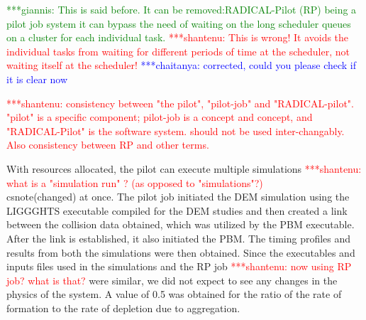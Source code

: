 \documentclass[preprint,11pt,authoryear]{elsarticle}
\newcommand{\jhanote}[1]{ {\textcolor{red} { ***shantenu: #1 }}}
\newcommand{\csnote}[1]{ {\textcolor{blue} { ***chaitanya: #1 }}}
\newcommand{\gpnote}[1]{{\textcolor{green} {***giannis: #1}}}
\newcommand{\jhanote}[1]{ {\textcolor{red} { ***shantenu: #1 }}}
\newcommand{\csnote}[1]{}
\newcommand{\gpnote}[1]{}
\begin{document}
\gpnote{This is said before. It can be removed:RADICAL-Pilot (RP) being a pilot job system it can bypass the need of
waiting on the long scheduler queues on a cluster for each individual task.} \jhanote{This is wrong! It
avoids the individual tasks from waiting for different periods of time at the
scheduler, not waiting itself at the scheduler!} \csnote{corrected, could you please check if it is clear now} 

\jhanote{consistency between
"the pilot", "pilot-job" and "RADICAL-pilot". "pilot" is a specific component; pilot-job is a  concept and concept, and "RADICAL-Pilot" is the software system. should not be used inter-changably. Also consistency between RP and other terms.} 

With resources allocated, the pilot can execute multiple simulations
\jhanote{what is a "simulation run" ? (as opposed to "simulations"?)} \\csnote(changed) 
at once.
The pilot job initiated the DEM simulation using the LIGGGHTS executable
compiled for the DEM studies and then created a link between the collision
data obtained, which was utilized by the PBM executable. After the link is
established, it also initiated the PBM. The timing profiles and results from
both the simulations were then obtained. Since the executables and inputs
files used in the simulations and the RP job \jhanote{now using RP job? what
is that?} were similar, we did not expect to see any changes in the physics of
the system. A value of 0.5 was obtained for the ratio of the rate of formation
to the rate of depletion due to aggregation.
\end{document}
